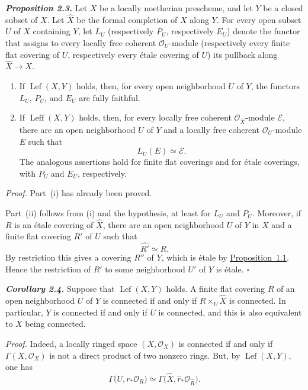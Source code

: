 \documentclass[11pt,a4paper,oneside]{book}
\providecommand{\Lefc}{\operatorname{Lef}}
\providecommand{\Leffc}{\operatorname{Leff}}
\theoremstyle{plain}
\theoremstyle{definition}
\theoremstyle{remark}
\begin{document}
\medskip
{}\noindent\textbf{\textit{Proposition 2.3.}}
Let $X$ be a locally noetherian prescheme, and let $Y$ be a closed subset of
$X$. Let $\widehat X$ be the formal completion of $X$ along $Y$. For every
open subset $U$ of $X$ containing $Y$, let $L_U$ (respectively $P_U$,
respectively $E_U$) denote the functor that assigns to every locally free
coherent $\mathcal O_U$-module (respectively every finite flat covering of
$U$, respectively every \'{e}tale covering of $U$) its pullback along
$\widehat X\to X$.

\begin{enumerate}[label=(\roman*),leftmargin=2.5em]
\item If $\Lefc(X,Y)$ holds, then, for every open neighborhood $U$ of $Y$,
the functors $L_U$, $P_U$, and $E_U$ are fully faithful.

\item If $\Leffc(X,Y)$ holds, then, for every locally free coherent
$\mathcal O_{\widehat X}$-module $\mathcal E$, there are an open
neighborhood $U$ of $Y$ and a locally free coherent $\mathcal O_U$-module
$E$ such that
\[
  L_U(E)\simeq\mathcal E.
\]
The analogous assertions hold for finite flat coverings and for \'{e}tale
coverings, with $P_U$ and $E_U$, respectively.
\end{enumerate}

\medskip
\noindent\textit{Proof.}
Part~(i) has already been proved.

Part~(ii) follows from (i) and the hypothesis, at least for $L_U$ and $P_U$.
Moreover, if $R$ is an \'{e}tale covering of $\widehat X$, there are an open
neighborhood $U$ of $Y$ in $X$ and a finite flat covering $R'$ of $U$ such
that
\[
  \widehat{R'}\simeq R.
\]
By restriction this gives a covering $R''$ of $Y$, which is \'{e}tale by
\hyperref[X.1.1]{Proposition~1.1}. Hence the restriction of $R'$ to some neighborhood $U'$ of
$Y$ is \'{e}tale.
\hfill$\square$

\medskip
{}\noindent\textbf{\textit{Corollary 2.4.}}
Suppose that $\Lefc(X,Y)$ holds. A finite flat covering $R$ of an open
neighborhood $U$ of $Y$ is connected if and only if
$R\times_U\widehat X$ is connected. In particular, $Y$ is connected if and
only if $U$ is connected, and this is also equivalent to $X$ being
connected.

\medskip
\noindent\textit{Proof.}
Indeed, a locally ringed space $(X,\mathcal O_X)$ is connected if and only if
$\Gamma(X,\mathcal O_X)$ is not a direct product of two nonzero rings. But,
by $\Lefc(X,Y)$, one has
\[
  \Gamma\bigl(U,r_*\mathcal O_R\bigr)
  \simeq
  \Gamma\bigl(\widehat X,\widehat r_*\mathcal O_{\widehat R}\bigr).
\]
\end{document}
